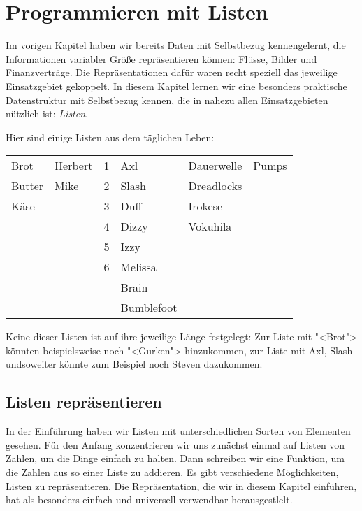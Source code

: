 
\chapter{Programmieren mit Listen}
\label{cha:rek}
\label{cha:list}

Im vorigen Kapitel haben wir bereits Daten mit Selbstbezug
kennengelernt, die Informationen variabler Größe repräsentieren
können: Flüsse, Bilder und Finanzverträge.  Die Repräsentationen dafür
waren recht speziell das jeweilige Einsatzgebiet gekoppelt.  In diesem
Kapitel lernen wir eine besonders praktische Datenstruktur mit
Selbstbezug kennen, die in nahezu allen Einsatzgebieten nützlich ist:
\textit{Listen}.

Hier sind einige Listen aus dem täglichen Leben:
%
\begin{center}
  \begin{tabular}{l@{\qquad}l@{\qquad}l@{\qquad}l@{\qquad}l@{\qquad}l}
  Brot & Herbert & 1 & Axl & Dauerwelle & Pumps \\
  Butter & Mike & 2 & Slash & Dreadlocks \\
  Käse & & 3 & Duff & Irokese \\
  & & 4 & Dizzy & Vokuhila \\
  && 5 & Izzy \\
  && 6 & Melissa \\
  &&& Brain\\
  &&& Bumblefoot 
\end{tabular}
\end{center}
%
Keine dieser Listen ist auf ihre jeweilige Länge festgelegt: Zur Liste
mit "<Brot"> könnten beispielsweise noch "<Gurken"> hinzukommen, zur
Liste mit Axl, Slash undsoweiter könnte zum Beispiel noch Steven
dazukommen.

\section{Listen repräsentieren}

In der Einführung haben wir Listen mit unterschiedlichen Sorten von
Elementen gesehen.  Für den Anfang konzentrieren wir uns zunächst
einmal auf Listen von Zahlen, um die Dinge einfach zu halten.  Dann
schreiben wir eine Funktion, um die Zahlen aus so einer Liste zu
addieren. Es gibt verschiedene Möglichkeiten, Listen zu
repräsentieren.  Die Repräsentation, die wir in diesem Kapitel
einführen, hat als besonders einfach und universell verwendbar
herausgestlelt.

